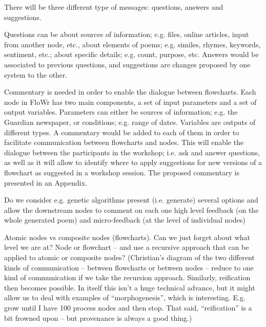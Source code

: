 \begin{mdframed}
There will be three different type of messages: questions, answers and
suggestions.

Questions can be about sources of information; e.g. files, online
articles, input from another node, etc., about elements of poems;
e.g. similes, rhymes, keywords, sentiment, etc.; about specific
details; e.g. count, purpose, etc. Answers would be associated to
previous questions, and suggestions are changes proposed by one system
to the other.

Commentary is needed in order to enable the dialogue between
flowcharts. Each node in FloWr has two main components, a set of input
parameters and a set of output variables.  Parameters can either be
sources of information; e.g. the Guardian newspaper, or conditions;
e.g. range of dates. Variables are outputs of different types.  A
commentary would be added to each of them in order to facilitate
communication between flowcharts and nodes. This will enable the
dialogue between the participants in the workshop; i.e. ask and answer
questions, as well as it will allow to identify where to apply
suggestions for new versions of a flowchart as suggested in a workshop
session. The proposed commentary is presented in an Appendix.


Do we consider e.g. genetic algorithms present (i.e. generate) several
options and allow the downstream nodes to comment on each one high
level feedback (on the whole generated poem) and micro-feedback (at
the level of individual nodes)

Atomic nodes vs composite nodes (flowcharts).  Can we just forget
about what level we are at?  Node or flowchart -- and use a recursive
approach that can be applied to atomic or composite nodes?
(Christian’s diagram of the two different kinds of communication --
between flowcharts or between nodes -- reduce to one kind of
communication if we take the recursion approach.  Similarly,
reification then becomes possible.  In itself this isn’t a huge
technical advance, but it might allow us to deal with examples of
``morphogenesis'', which is interesting.  E.g. grow until I have 100
process nodes and then stop. That said, ``reification'' is a bit
frowned upon -- but provenance is always a good thing.)
\end{mdframed}



